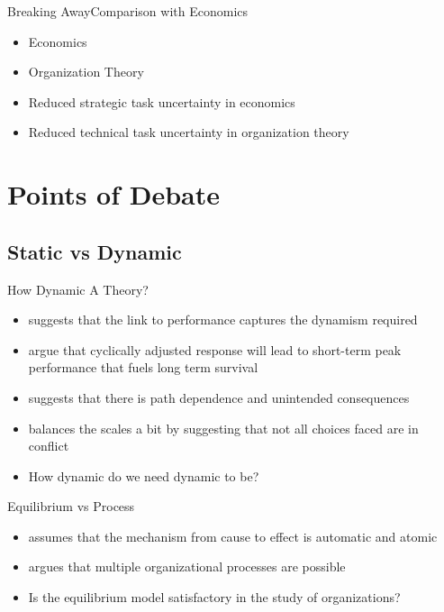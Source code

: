 \documentclass{beamer}
\begin{document}
\begin{frame}{Breaking Away}{Comparison with Economics}
  \begin{itemize}
  \item<1->{Economics }
  \item<3-> {Organization Theory }
  \item <5->{Reduced strategic task uncertainty in economics}
  \item <6->{Reduced technical task uncertainty in organization theory}
  \end{itemize}
\end{frame}

\section{Points of Debate}

\subsection{Static vs Dynamic}
\begin{frame}{How Dynamic A Theory?}
\begin{itemize}
\item{\cite{Donaldson1987} suggests that the link to performance captures the dynamism required}
\item{\cite{Smith2011} argue that cyclically adjusted response will lead to  short-term peak performance that fuels long term survival}
\item{\cite{Siggelkow2002} suggests that there is path dependence and unintended consequences}
\item{\cite{Miller1992} balances the scales a bit by suggesting that not all choices faced are in conflict}
\item<2->{How dynamic do we need dynamic to be?}
\end{itemize}
\end{frame}

\begin{frame}{Equilibrium vs Process}
\begin{itemize}
\item{\cite{Donaldson1987} assumes that the mechanism from cause to effect is automatic and atomic}
\item{\cite{Siggelkow2002} argues that multiple organizational processes are  possible}
\item<2->{Is the equilibrium model satisfactory in the study of organizations?}
\end{itemize}
\end{frame}
\end{document}
